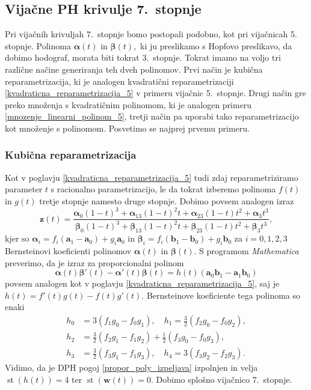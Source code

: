 \documentclass[12pt,a4paper,twoside]{article}
\theoremstyle{definition} %
\theoremstyle{plain} %
\numberwithin{equation}{section}  %
\newcommand{\aV}{\mathbf{a}}
\newcommand{\bV}{\mathbf{b}}
\newcommand{\wV}{\mathbf{w}}
\newcommand{\zV}{\mathbf{z}}
\newcommand{\balpha}{\boldsymbol \alpha}
\newcommand{\bbeta}{\boldsymbol \beta}
\DeclareMathOperator{\st}{st}
\begin{document}
\subsection{Vijačne PH krivulje 7.\ stopnje}
\label{podpoglavje_vijacne7stopnje}

Pri vijačnih krivuljah 7.\ stopnje bomo postopali podobno, kot pri vijačnicah 5.~ stopnje. Polinoma $\balpha(t)$ in $\bbeta(t),$ ki ju preslikamo s Hopfovo preslikavo, da dobimo hodograf, morata biti tokrat 3.\ stopnje. Tokrat imamo na voljo tri različne načine generiranja teh dveh polinomov. Prvi način je kubična reparametrizacija, ki je analogen kvadratični reparametrizaciji \ref{kvadraticna_reparametrizacija_5} v primeru vijačnic 5.\ stopnje. Drugi način gre preko množenja s kvadratičnim polinomom, ki je analogen primeru \ref{mnozenje_linearni_polinom_5}, tretji način pa uporabi tako reparametrizacijo kot množenje s polinomom. Posvetimo se najprej prvemu primeru.

\subsubsection{Kubična reparametrizacija}
\label{kubicna_reparametrizacija_7}

Kot v poglavju \ref{kvadraticna_reparametrizacija_5} tudi zdaj reparametriziramo parameter $t$ s racionalno parametrizacijo, le da tokrat izberemo polinoma $f(t)$ in $g(t)$ tretje stopnje namesto druge stopnje. Dobimo povsem analogen izraz
\begin{equation*}
	\zV(t)=\frac{\balpha_0(1-t)^3+\balpha_13(1-t)^2t+\balpha_23(1-t)t^2+\balpha_3t^3}{\bbeta_0(1-t)^3+\bbeta_13(1-t)^2t+\bbeta_23(1-t)t^2+\bbeta_3t^3},
\end{equation*}
kjer so $\balpha_i=f_i(\aV_1-\aV_0)+g_i\aV_0$ in $\bbeta_i=f_i(\bV_1-\bV_0)+g_i\bV_0$ za $i=0,1,2,3$ Bernsteinovi koeficienti polinomov $\balpha(t)$ in $\bbeta(t).$ S programom \emph{Mathematica} preverimo, da je izraz za proporcionalni polinom
\begin{equation*}
	\balpha(t)\bbeta'(t)-\balpha'(t)\bbeta(t)=h(t)(\aV_0\bV_1-\aV_1\bV_0)
\end{equation*}
povsem analogen kot v poglavju \ref{kvadraticna_reparametrizacija_5}, saj je $h(t)=f'(t)g(t)-f(t)g'(t).$ Bernsteinove koeficiente tega polinoma so enaki
\begin{align}
	\label{h_coeffs_cubic_repara}
	h_0&=3(f_1g_0-f_0g_1),\quad h_1=\frac{3}{2}(f_2g_0-f_0g_2),\nonumber\\
	h_2&=\frac{3}{2}(f_2g_1-f_1g_2)+\frac{1}{2}(f_3g_0-f_0g_3),\nonumber\\
	h_3&=\frac{3}{2}(f_3g_1-f_1g_3),\quad h_4=3(f_3g_2-f_2g_3).
\end{align}
Vidimo, da je DPH pogoj \eqref{propor_poly_izpeljava} izpolnjen in velja $\st(h(t))=4$ ter $\st(\wV(t))=0.$ Dobimo splošno vijačnico 7.\ stopnje.
\end{document}
